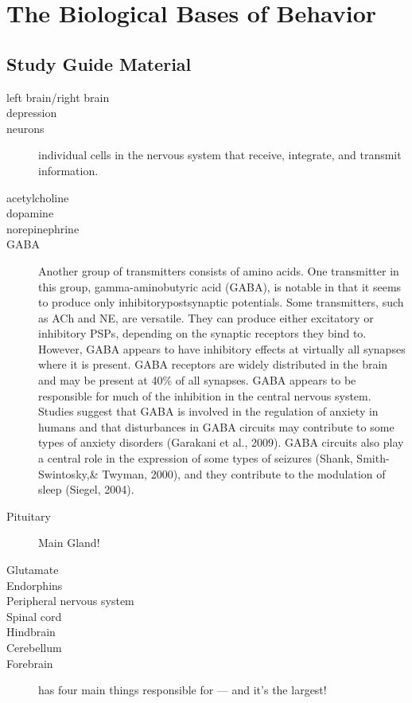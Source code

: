 \documentclass{article}
\begin{document}
\section{The Biological Bases of Behavior}

\subsection{Study Guide Material}
\begin{description}
    \item [left brain/right brain]
    \item [depression]
    \item [neurons] individual cells in the nervous system that receive, integrate, and transmit information.
    \item [acetylcholine]
    \item [dopamine]
    \item [norepinephrine]
    \item [GABA] Another group of transmitters consists of amino acids. One transmitter in this group, gamma-aminobutyric acid (GABA), is notable in that it seems to produce only inhibitorypostsynaptic potentials. Some transmitters, such as ACh and NE, are versatile. They can produce either excitatory or inhibitory PSPs, depending on the synaptic receptors they bind to. However, GABA appears to have inhibitory effects at virtually all synapses where it is present. GABA receptors are widely distributed in the brain and may be present at 40\% of all synapses. GABA appears to be responsible for much of the inhibition in the central nervous system. Studies suggest that GABA is involved in the regulation of anxiety in humans and that disturbances in GABA circuits may contribute to some types of anxiety disorders (Garakani et al., 2009). GABA circuits also play a central role in the expression of some types of seizures (Shank, Smith-Swintosky,\& Twyman, 2000), and they contribute to the modulation of sleep (Siegel, 2004).
    \item [Pituitary] Main Gland!
    \item [Glutamate]
    \item [Endorphins]
    \item [Peripheral nervous system]
    \item [Spinal cord]
    \item [Hindbrain]
    \item [Cerebellum]
    \item [Forebrain] has four main things responsible for --- and it's the largest!

\end{description}
\end{document}
